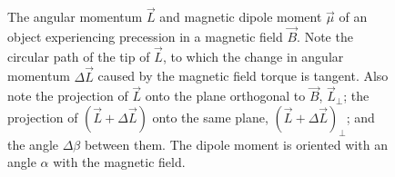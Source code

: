 \documentclass[11pt]{article}
\begin{document}
\begin{figure}[H]
  \caption{The angular momentum $\vec L$ and magnetic dipole moment $\vec \mu$
    of an object experiencing precession in a magnetic field $\vec
    B$. Note the circular path of the
    tip of $\vec L$, to which the change in angular momentum $\Delta
    \vec L$ caused by
    the magnetic field torque is tangent. Also note the projection of
    $\vec L$ onto the
    plane orthogonal to $\vec B$, $\vec L_\perp$; the projection of
    $(\vec L + \Delta \vec L)$ onto the same plane, $(\vec L + \Delta
    \vec L)_\perp$; and the angle $\Delta \beta$ between them. The dipole moment
  is oriented with an angle $\alpha$ with the magnetic field.}
  \label{fig:dipole_angular_momentum_3d}
\end{figure}
\end{document}
